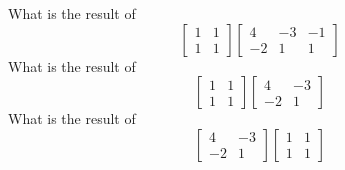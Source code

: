 \bexo
What is the result of 
\begin{equation*}
\left[
\begin{array}{cc}
1 & 1\\
1 & 1
\end{array}
\right]
\left[
\begin{array}{ccc}
4 & -3 & -1\\
-2 & 1 & 1
\end{array}
\right]
\end{equation*}
\eexo
{}
\bexo
What is the result of 
\begin{equation*}
\left[
\begin{array}{cc}
1 & 1\\
1 & 1
\end{array}
\right]
\left[
\begin{array}{cc}
4 & -3\\
-2 & 1
\end{array}
\right]
\end{equation*}
\eexo
\solution{
\begin{equation*}
\left[
\begin{array}{cc}
0 & 0\\
2 & 0
\end{array}
\right]
\end{equation*}
}
\bexo
What is the result of 
\begin{equation*}
\left[
\begin{array}{cc}
4 & -3\\
-2 & 1
\end{array}
\right]
\left[
\begin{array}{cc}
1 & 1\\
1 & 1
\end{array}
\right]
\end{equation*}
\eexo
\solution{
\begin{equation*}
\left[
\begin{array}{cc}
3 & 3\\
-3 & -3
\end{array}
\right]
\end{equation*}
}
